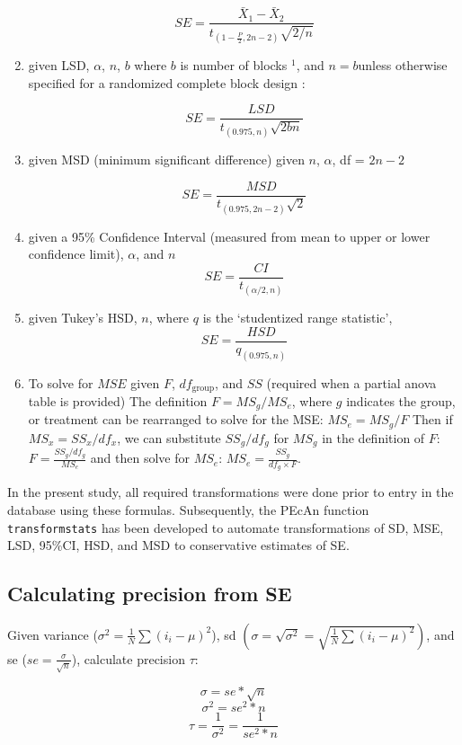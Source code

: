 \documentclass[12pt]{article}
\begin{document}
\begin{flushleft}
\begin{spacing}{1}
\begin{enumerate}
$$SE=\frac{\bar X_1-\bar X_2}{t_{(1-\frac{P}{2},2n-2)}\sqrt{2/n}}$$

\item given LSD, $\alpha$, $n$, $b$ where $b$ is number of blocks $^{1}$, and $n=b$unless otherwise specified for a randomized complete block design \citep{rosenberg2004map}:

$$SE = \frac{LSD}{t_{(0.975,n)}\sqrt{2bn}}$$

\item given MSD (minimum significant difference) given $n$, $\alpha$, df = $2n-2$  \citep{wang2000asp}

$$SE = \frac{MSD}{t_{(0.975, 2n-2)}\sqrt{2}}$$

\item given a 95\% Confidence Interval (measured from mean to upper or lower confidence limit), $\alpha$, and $n$  \citep{saville2003bsi}
$$SE = \frac{CI}{t_{(\alpha/2,n)}}$$
\item given Tukey's HSD, $n$, where $q$ is the `studentized range statistic', $$SE = \frac{HSD}{q_{(0.975,n)}}$$
\item To solve for $MSE$ given $F$, $df_{\textrm{group}}$, and $SS$ (required when a partial anova table is provided)
The definition $F = MS_g/MS_e$, where $g$ indicates the group, or treatment can be rearranged to solve for the MSE: $MS_e=MS_g/F$
 Then if $MS_x = SS_x/df_x$, we can substitute $SS_g/df_g$ for $MS_g$ in the definition of $F$: $F=\frac{SS_g/df_g}{MS_e}$ and then solve for $MS_e$: $MS_e = \frac{SS_g}{df_g\times F}$.

\end{enumerate}
 In the present study, all required transformations were done prior to entry in the database using these formulas. 
 Subsequently, the PEcAn function \texttt{transformstats} has been developed to automate transformations of SD, MSE, LSD, 95\%CI, HSD, and MSD to conservative estimates of SE.

\subsection*{Calculating precision from SE}

Given variance ($\sigma^2=\frac{1}{N}\sum(i_i-\mu)^2$), sd $\left(\sigma=\sqrt{\sigma^2}=\sqrt{\frac{1}{N}\sum(i_i-\mu)^2}\right)$, and se ($se=\frac{\sigma}{\sqrt{n}}$), calculate precision $\tau$:

$$\sigma=se*\sqrt{n}$$
$$\sigma^2=se^2*n$$
$$\tau=\frac{1}{\sigma^2}=\frac{1}{se^2*n}$$


\end{spacing}
\end{flushleft}
\end{document}
